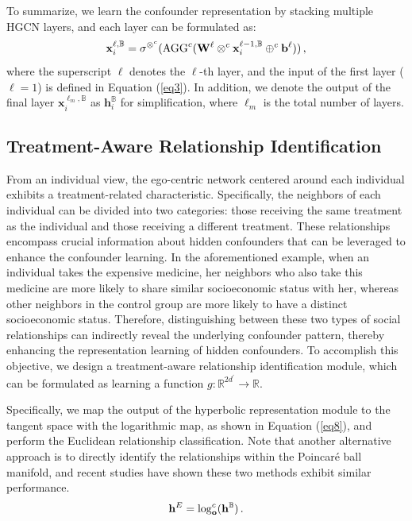 \documentclass[twoside,leqno,twocolumn]{article}
\begin{document}
To summarize, we learn the confounder representation by stacking multiple HGCN layers, and each layer can be formulated as:
\begin{equation}
\vspace{-0.2em}
\label{eq7}
    \mathbf{x}^{\ell,\mathbb{B}}_i 
    = \sigma^{\otimes ^{{c}}} (\text{AGG}^{c}(\mathbf{W}^{\ell} \otimes ^{c} \mathbf{x}^{\ell-1,\mathbb{B}}_i \oplus ^{c}\mathbf{b}^\ell)) \,,
\end{equation}
where the superscript $\ell$ denotes the $\ell$-th layer, and 
the input of the first layer ($\ell=1$) is defined in Equation (\ref{eq3}). 
In addition, we denote the output of the final layer $\mathbf{x}^{\ell_{m},\mathbb{B}}_i$ as $\mathbf{h}^\mathbb{B}_i$ for simplification, where $\ell_{m}$ is the total number of layers.
\vspace{-0.8em}
\subsection{Treatment-Aware Relationship Identification}
From an individual view, the ego-centric network centered around each individual exhibits a treatment-related characteristic.
Specifically, the neighbors of each individual can be divided into two categories: those receiving the same treatment as the individual and those receiving a different treatment. These relationships encompass crucial information about hidden confounders that can be leveraged to enhance the confounder learning.
In the aforementioned example, when an individual takes the expensive medicine, her neighbors who also take this medicine are more likely to share similar socioeconomic status with her, whereas other neighbors in the control group are more likely to have a distinct socioeconomic status. Therefore, distinguishing between these two types of social relationships can indirectly reveal the underlying confounder pattern, thereby enhancing the representation learning of hidden confounders.
To accomplish this objective, we design a treatment-aware relationship identification module, which can be formulated as learning a function $g: \mathbb{R}^{2d^\prime} \rightarrow \mathbb{R}$.

Specifically, we map the output of the hyperbolic representation module to the tangent space with the logarithmic map, as shown in Equation (\ref{eq8}), and perform the Euclidean relationship classification. Note that another alternative approach is to directly identify the relationships within the Poincar\'{e} ball manifold, and recent studies \cite{chami2019hyperbolic} have shown these two methods exhibit similar performance.
\begin{equation}
\vspace{-0.2em}
\label{eq8}
    \mathbf{h}^E = \log_{\mathbf{o}}^c (\mathbf{h}^\mathbb{B}) \,.
\end{equation}
\end{document}
